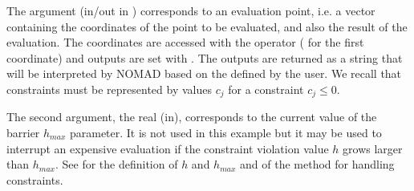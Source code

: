 \documentclass[letterpaper,10pt,english]{sphinxmanual}
\begin{document}
\begin{sphinxVerbatim}[commandchars=\\\{\}]


\end{sphinxVerbatim}

\sphinxAtStartPar
The argument  (in/out in ) corresponds to an evaluation point, i.e. a vector containing the
coordinates of the point to be evaluated, and also the result of the evaluation.
The coordinates are accessed with the operator \sphinxcode{\sphinxupquote{{[}{]}}} ( for the first coordinate) and outputs are set with .
The outputs are returned as a string that will be interpreted by NOMAD based on the  defined by the user.
We recall that constraints must be represented by values \(c_j\) for a constraint \(c_j \leq 0\).

\sphinxAtStartPar
The second argument, the real  (in), corresponds to the current value of the barrier \(h_{max}\) parameter.
It is not used in this example but it may be used to interrupt an expensive evaluation if the constraint violation value \(h\) grows larger than \(h_{max}\).
See  for the definition of \(h\) and \(h_{max}\) and of the  method for handling constraints.
\end{document}
